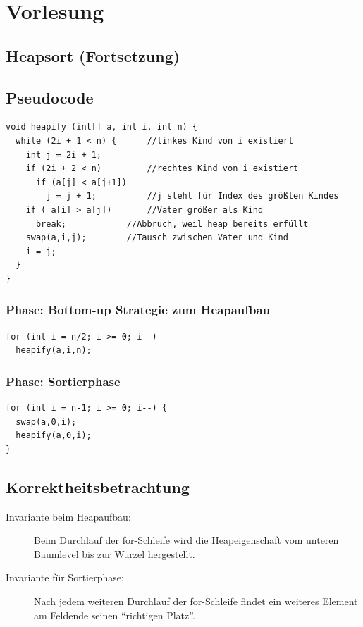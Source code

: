 \chapter{Vorlesung}
\section*{Heapsort (Fortsetzung)}

\section{Pseudocode}
\begin{lstlisting}[style = pseudo]
void heapify (int[] a, int i, int n) {
  while (2i + 1 < n) {		//linkes Kind von i existiert
    int j = 2i + 1;
    if (2i + 2 < n)  		//rechtes Kind von i existiert
      if (a[j] < a[j+1])
        j = j + 1;  		//j steht für Index des größten Kindes
    if ( a[i] > a[j])  		//Vater größer als Kind
      break;  			//Abbruch, weil heap bereits erfüllt
    swap(a,i,j); 		//Tausch zwischen Vater und Kind
    i = j;
  }
}
\end{lstlisting}
\subsection{Phase: Bottom-up Strategie zum Heapaufbau}
\begin{lstlisting}[style = pseudo]
for (int i = n/2; i >= 0; i--)
  heapify(a,i,n);
\end{lstlisting}
\subsection{Phase: Sortierphase}
\begin{lstlisting}[style = pseudo]
for (int i = n-1; i >= 0; i--) {
  swap(a,0,i);
  heapify(a,0,i);
}
\end{lstlisting}
\section{Korrektheitsbetrachtung}
\begin{description}
	\item[Invariante beim Heapaufbau:] Beim Durchlauf der for-Schleife wird die Heapeigenschaft vom unteren Baumlevel bis zur Wurzel hergestellt.
	\item[Invariante für Sortierphase:] Nach jedem weiteren Durchlauf der for-Schleife findet ein weiteres Element am Feldende seinen "`richtigen Platz"'.
\end{description}

